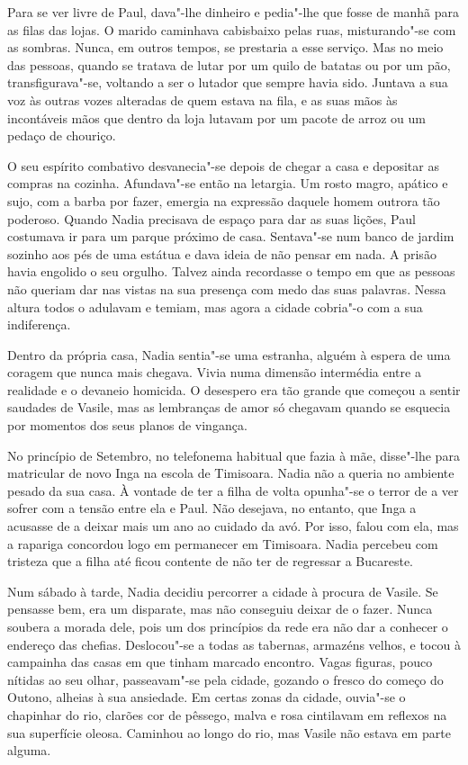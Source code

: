 Para se ver livre de Paul, dava"-lhe dinheiro e pedia"-lhe que fosse de
manhã para as filas das lojas. O marido caminhava cabisbaixo pelas
ruas, misturando"-se com as sombras. Nunca, em outros tempos, se
prestaria a esse serviço. Mas no meio das pessoas, quando se tratava de
lutar por um quilo de batatas ou por um pão, transfigurava"-se, voltando
a ser o lutador que sempre havia sido. Juntava a sua voz às outras vozes
alteradas de quem estava na fila, e as suas mãos às incontáveis mãos que
dentro da loja lutavam por um pacote de arroz ou um pedaço de
chouriço.

O seu espírito combativo desvanecia"-se depois de chegar a
casa e depositar as compras na cozinha. Afundava"-se então na letargia.
Um rosto magro, apático e sujo, com a barba por fazer, emergia na
expressão daquele homem outrora tão poderoso. Quando Nadia precisava de
espaço para dar as suas lições, Paul costumava ir para um parque próximo
de casa. Sentava"-se num banco de jardim sozinho aos pés de uma estátua e
dava ideia de não pensar em nada. A prisão havia engolido o seu orgulho.
Talvez ainda recordasse o tempo em que as pessoas não queriam dar nas
vistas na sua presença com medo das suas palavras. Nessa altura todos o
adulavam e temiam, mas agora a cidade
cobria"-o com a sua indiferença.

Dentro da própria casa, Nadia sentia"-se uma estranha, alguém à espera de
uma coragem que nunca mais chegava. Vivia numa dimensão intermédia entre
a realidade e o devaneio homicida. O desespero era tão grande que começou a sentir saudades de Vasile, mas as lembranças de amor só chegavam
quando se esquecia por momentos dos seus planos de vingança.

No princípio de Setembro, no telefonema habitual que fazia à mãe,
disse"-lhe para matricular de novo Inga na escola de Timisoara. Nadia não
a queria no ambiente pesado da sua casa. À vontade de ter a filha de
volta opunha"-se o terror de a ver sofrer com a tensão entre ela e Paul.
Não desejava, no entanto, que Inga a acusasse de a deixar mais um ano ao
cuidado da avó. Por isso, falou com ela, mas a rapariga concordou logo
em permanecer em Timisoara. Nadia percebeu com tristeza que a filha até
ficou contente de não ter de regressar a Bucareste.

Num sábado à tarde, Nadia decidiu percorrer a cidade à procura de
Vasile. Se pensasse bem, era um disparate, mas não conseguiu deixar de o
fazer. Nunca soubera a morada dele, pois um dos princípios da rede era
não dar a conhecer o endereço das chefias. Deslocou"-se a todas as
tabernas, armazéns velhos, e tocou à campainha das casas em que tinham
marcado encontro. Vagas figuras, pouco nítidas ao seu olhar,
passeavam"-se pela cidade, gozando o fresco do começo do Outono, alheias
à sua ansiedade. Em certas zonas da cidade, ouvia"-se o chapinhar do rio,
clarões cor de pêssego, malva e rosa cintilavam em reflexos na sua
superfície oleosa. Caminhou ao longo do rio, mas Vasile não estava em
parte alguma.

